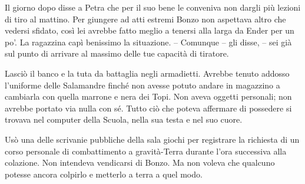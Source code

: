 {Il giorno dopo disse a Petra che per il suo bene le conveniva non
	dargli più lezioni di tiro al mattino. Per giungere ad atti estremi
	Bonzo non aspettava altro che vedersi sfidato, così lei avrebbe fatto
	meglio a tenersi alla larga da Ender per un po'. La ragazzina capì
	benissimo la situazione. -- Comunque -- gli disse, -- sei già sul punto
	di arrivare al massimo delle tue capacità di tiratore.}

{Lasciò il banco e la tuta da battaglia negli armadietti. Avrebbe tenuto
	addosso l'uniforme delle Salamandre finché non avesse potuto andare in
	magazzino a cambiarla con quella marrone e nera dei Topi. Non aveva
	oggetti personali; non avrebbe portato via nulla con sé. Tutto ciò che
	poteva affermare di possedere si trovava nel computer della Scuola,
	nella sua testa e nel suo cuore.}

{Usò una delle scrivanie pubbliche della sala giochi per registrare la
	richiesta di un corso personale di combattimento a gravità-Terra durante
	l'ora successiva alla colazione. Non intendeva vendicarsi di Bonzo. Ma
	non voleva che qualcuno potesse ancora colpirlo e metterlo a terra a
	quel modo.}

\label{Orsonux20Scottux20Cardux20-ux20Ilux20Giocoux20Diux20Enderux20-ux20BY_SLY70A1_split_010.htm}{}
